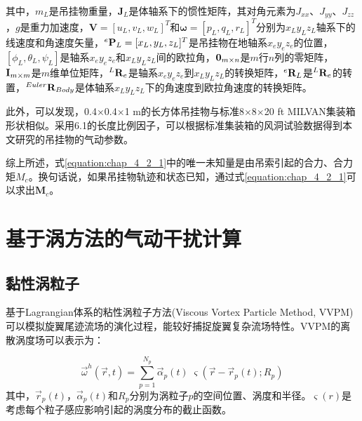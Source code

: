 其中，$m_L$是吊挂物重量，$\mathbf{J}_L$是体轴系下的惯性矩阵，其对角元素为$J_{xx}$、$J_{yy}$、$J_{zz}$，$g$是重力加速度，$\mathbf{V}=[u_L,v_L,w_L]^T$和$\bm{\omega}=[p_L,q_L,r_L]^T$分别为$x_Ly_Lz_L$轴系下的线速度和角速度矢量，${^e{{\bf{P}}_L}}=[x_L,y_L,z_L]^T$是吊挂物在地轴系$x_ey_ez_e$的位置，$\left[ {{\phi _L},{\theta _L},{\psi _L}} \right]$是轴系${x_e}{y_e}{z_e}$和${x_L}{y_L}{z_L}$间的欧拉角，${{\bf{0}}_{m \times n}}$是$m$行$n$列的零矩阵，${{\bf{I}}_{m \times m}}$是$m$维单位矩阵，$^L{{\bf{R}}_e}$是轴系${x_e}{y_e}{z_e}$到${x_L}{y_L}{z_L}$的转换矩阵，$^e{{\bf{R}}_L}$是$^L{{\bf{R}}_e}$的转置，$^{Euler}{{\bf{R}}_{Body}}$是体轴系${x_L}{y_L}{z_L}$下的角速度到欧拉角速度的转换矩阵。

此外，可以发现，0.4$\times$0.4$\times$1 m的长方体吊挂物与标准8$\times$8$\times$20 ft MILVAN集装箱形状相似。采用6.1的长度比例因子，可以根据标准集装箱的风洞试验数据\cite{cicolani1987comprehensive,da2003unsteady,cicolani2009flight}得到本文研究的吊挂物的气动参数。

综上所述，式\ref{equation:chap_4_2_1}中的唯一未知量是由吊索引起的合力、合力矩$M_c$。换句话说，如果吊挂物轨迹和状态已知，通过式\ref{equation:chap_4_2_1}可以求出$\mathbf{M}_c$。


\section{基于涡方法的气动干扰计算}
\subsection{黏性涡粒子}
基于Lagrangian体系的粘性涡粒子方法(Viscous Vortex Particle Method, VVPM)可以模拟旋翼尾迹流场的演化过程，能较好捕捉旋翼复杂流场特性。VVPM的离散涡度场可以表示为：

\begin{equation}
    {\vec \omega ^h}\left( {\vec r,t} \right) = \sum\limits_{p = 1}^{{N_p}} {{{\vec \alpha }_p}\left( t \right)} \;\varsigma \left( {\vec r - {{\vec r}_p}\left( t \right);{R_p}} \right)
\end{equation}
其中，${\vec r_p}\left( t \right)$，${\vec \alpha _p}\left( t \right)$和${R_p}$分别为涡粒子$p$的空间位置、涡度和半径。$\varsigma \left( r \right)$是考虑每个粒子感应影响引起的涡度分布的截止函数。

